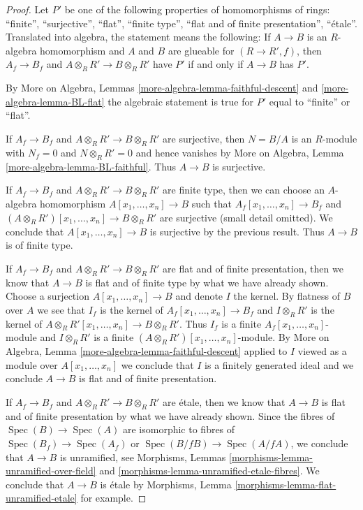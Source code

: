 \documentclass{stacks-project}
\theoremstyle{plain}
\theoremstyle{definition}
\theoremstyle{remark}
\numberwithin{equation}{subsection}
\def\Spec{\mathop{\mathrm{Spec}}}
\begin{document}
\begin{proof}
Let $P'$ be one of the following properties of homomorphisms of rings:
``finite'', ``surjective'', ``flat'', ``finite type'',
``flat and of finite presentation'', ``\'etale''.
Translated into algebra, the statement means the following:
If $A \to B$ is an $R$-algebra homomorphism and $A$ and $B$
are glueable for $(R \to R', f)$, then
$A_f \to B_f$ and $A \otimes_R R' \to B \otimes_R R'$ have $P'$
if and only if $A \to B$ has $P'$.

\medskip\noindent
By More on Algebra, Lemmas \ref{more-algebra-lemma-faithful-descent}
and \ref{more-algebra-lemma-BL-flat} the algebraic statement
is true for $P'$ equal to ``finite'' or ``flat''.

\medskip\noindent
If $A_f \to B_f$ and $A \otimes_R R' \to B \otimes_R R'$ are surjective,
then $N = B/A$ is an $R$-module with $N_f = 0$ and $N \otimes_R R' = 0$ and
hence vanishes by More on Algebra, Lemma
\ref{more-algebra-lemma-BL-faithful}. Thus $A \to B$ is surjective.

\medskip\noindent
If $A_f \to B_f$ and $A \otimes_R R' \to B \otimes_R R'$ are finite type,
then we can choose an $A$-algebra homomorphism $A[x_1, \ldots, x_n] \to B$
such that $A_f[x_1, \ldots, x_n] \to B_f$ and
$(A \otimes_R R')[x_1, \ldots, x_n] \to B \otimes_R R'$ are surjective
(small detail omitted). We conclude that $A[x_1, \ldots, x_n] \to B$
is surjective by the previous result. Thus $A \to B$ is of finite type.

\medskip\noindent
If $A_f \to B_f$ and $A \otimes_R R' \to B \otimes_R R'$ are
flat and of finite presentation, then we know that $A \to B$ is flat and
of finite type by what we have already shown. Choose a surjection
$A[x_1, \ldots, x_n] \to B$ and denote $I$ the kernel.
By flatness of $B$ over $A$ we see that $I_f$ is the kernel of
$A_f[x_1, \ldots, x_n] \to B_f$ and $I \otimes_R R'$ is the kernel of
$A \otimes_R R'[x_1, \ldots, x_n] \to B \otimes_R R'$.
Thus $I_f$ is a finite $A_f[x_1, \ldots, x_n]$-module and
$I \otimes_R R'$ is a finite $(A \otimes_R R')[x_1, \ldots, x_n]$-module.
By More on Algebra, Lemma \ref{more-algebra-lemma-faithful-descent}
applied to $I$ viewed as a module over $A[x_1, \ldots, x_n]$
we conclude that $I$ is a finitely generated ideal and we conclude
$A \to B$ is flat and of finite presentation.

\medskip\noindent
If $A_f \to B_f$ and $A \otimes_R R' \to B \otimes_R R'$ are \'etale,
then we know that $A \to B$ is flat and of finite presentation by what
we have already shown. Since the fibres of $\Spec(B) \to \Spec(A)$
are isomorphic to fibres of $\Spec(B_f) \to \Spec(A_f)$ or
$\Spec(B/fB) \to \Spec(A/fA)$, we conclude that $A \to B$ is unramified,
see Morphisms, Lemmas \ref{morphisms-lemma-unramified-over-field}
and \ref{morphisms-lemma-unramified-etale-fibres}.
We conclude that $A \to B$ is \'etale by
Morphisms, Lemma \ref{morphisms-lemma-flat-unramified-etale} for example.
\end{proof}
\end{document}
